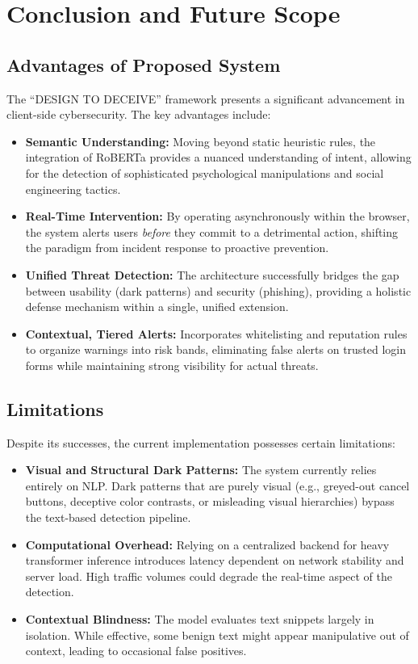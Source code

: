 \documentclass[12pt,a4paper]{report}
\begin{document}
\chapter{Conclusion and Future Scope}

\section{Advantages of Proposed System}
The ``DESIGN TO DECEIVE'' framework presents a significant advancement in client-side cybersecurity. The key advantages include:
\begin{itemize}
    \item \textbf{Semantic Understanding:} Moving beyond static heuristic rules, the integration of RoBERTa provides a nuanced understanding of intent, allowing for the detection of sophisticated psychological manipulations and social engineering tactics.
    \item \textbf{Real-Time Intervention:} By operating asynchronously within the browser, the system alerts users \textit{before} they commit to a detrimental action, shifting the paradigm from incident response to proactive prevention.
    \item \textbf{Unified Threat Detection:} The architecture successfully bridges the gap between usability (dark patterns) and security (phishing), providing a holistic defense mechanism within a single, unified extension.
    \item \textbf{Contextual, Tiered Alerts:} Incorporates whitelisting and reputation rules to organize warnings into risk bands, eliminating false alerts on trusted login forms while maintaining strong visibility for actual threats.
\end{itemize}

\section{Limitations}
Despite its successes, the current implementation possesses certain limitations:
\begin{itemize}
    \item \textbf{Visual and Structural Dark Patterns:} The system currently relies entirely on NLP. Dark patterns that are purely visual (e.g., greyed-out cancel buttons, deceptive color contrasts, or misleading visual hierarchies) bypass the text-based detection pipeline.
    \item \textbf{Computational Overhead:} Relying on a centralized backend for heavy transformer inference introduces latency dependent on network stability and server load. High traffic volumes could degrade the real-time aspect of the detection.
    \item \textbf{Contextual Blindness:} The model evaluates text snippets largely in isolation. While effective, some benign text might appear manipulative out of context, leading to occasional false positives.
\end{itemize}
\end{document}
